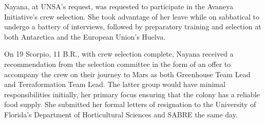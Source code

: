 Nayana, at UNSA's request, was requested to participate in the Avaneya Initiative's crew selection. She took advantage of her leave while on sabbatical to undergo a battery of interviews, followed by preparatory training and selection at both Antarctica and the European Union's Huelva. 

On 19 Scorpio, 11 B.R., with crew selection complete, Nayana received a recommendation from the selection committee in the form of an offer to accompany the crew on their journey to Mars as both Greenhouse Team Lead and Terraformation Team Lead. The latter group would have minimal responsibilities initially, her primary focus ensuring that the colony has a reliable food supply. She submitted her formal letters of resignation to the University of Florida's Department of Horticultural Sciences and SABRE the same day.

